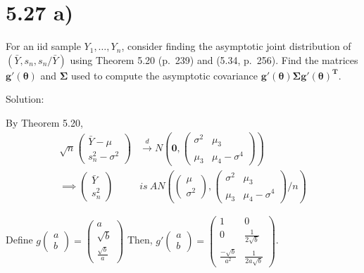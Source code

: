 \documentclass[
  letterpaper,
  DIV=11,
  numbers=noendperiod]{scrreprt}
\begin{document}
\newpage

\hypertarget{a-2}{%
\section{5.27 a)}\label{a-2}}

For an iid sample \(Y_1,\dots, Y_n\), consider finding the asymptotic
joint distribution of \((\bar Y, s_n, s_n/ \bar Y)\) using Theorem 5.20
(p.~239) and (5.34, p.~256). Find the matrices
\(\mathbf{g'(\boldsymbol \theta)}\) and \(\boldsymbol \Sigma\) used to
compute the asymptotic covariance
\(\mathbf{g'(\boldsymbol \theta) \boldsymbol \Sigma g'(\boldsymbol \theta)^T}\).

Solution:

By Theorem 5.20, \[ \begin{aligned}
\sqrt n \begin{pmatrix} \bar Y - \mu \\  s_n^2-\sigma^2\end{pmatrix} &\overset d \to N\left(\mathbf 0, \begin{pmatrix} \sigma^2 & \mu_3 \\ \mu_3 & \mu_4-\sigma^4 \end{pmatrix} \right) \\
\implies \begin{pmatrix} \bar Y \\  s_n^2 \end{pmatrix} & is~ AN\left( \begin{pmatrix} \mu \\  \sigma^2\end{pmatrix}, \begin{pmatrix} \sigma^2 & \mu_3 \\ \mu_3 & \mu_4-\sigma^4 \end{pmatrix}/n \right)
\end{aligned}\]

Define
\(g \begin{pmatrix} a \\b \end{pmatrix} = \begin{pmatrix} a \\ \sqrt b \\ \frac {\sqrt b} a \end{pmatrix}\)
Then,
\(g' \begin{pmatrix} a \\b \end{pmatrix} = \begin{pmatrix} 1 & 0 \\ 0 & \frac{1}{2 \sqrt b} \\ \frac{-\sqrt b}{a^2} & \frac{1}{2a\sqrt b}\end{pmatrix}\).
\end{document}
